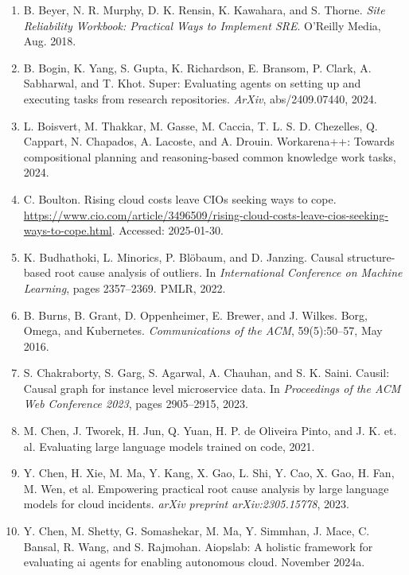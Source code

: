 \documentclass[10pt,UTF8,fontset=fandol]{ctexart}
\begin{document}
\begin{enumerate}[leftmargin=2em,itemsep=2pt]
\item B. Beyer, N. R. Murphy, D. K. Rensin, K. Kawahara, and S. Thorne. \textit{Site Reliability Workbook: Practical Ways to Implement SRE}. O'Reilly Media, Aug. 2018.

\item B. Bogin, K. Yang, S. Gupta, K. Richardson, E. Bransom, P. Clark, A. Sabharwal, and T. Khot. Super: Evaluating agents on setting up and executing tasks from research repositories. \textit{ArXiv}, abs/2409.07440, 2024.

\item L. Boisvert, M. Thakkar, M. Gasse, M. Caccia, T. L. S. D. Chezelles, Q. Cappart, N. Chapados, A. Lacoste, and A. Drouin. Workarena++: Towards compositional planning and reasoning-based common knowledge work tasks, 2024.

\item C. Boulton. Rising cloud costs leave CIOs seeking ways to cope. \url{https://www.cio.com/article/3496509/rising-cloud-costs-leave-cios-seeking-ways-to-cope.html}. Accessed: 2025-01-30.

\item K. Budhathoki, L. Minorics, P. Bl\"obaum, and D. Janzing. Causal structure-based root cause analysis of outliers. In \textit{International Conference on Machine Learning}, pages 2357--2369. PMLR, 2022.

\item B. Burns, B. Grant, D. Oppenheimer, E. Brewer, and J. Wilkes. Borg, Omega, and Kubernetes. \textit{Communications of the ACM}, 59(5):50--57, May 2016.

\item S. Chakraborty, S. Garg, S. Agarwal, A. Chauhan, and S. K. Saini. Causil: Causal graph for instance level microservice data. In \textit{Proceedings of the ACM Web Conference 2023}, pages 2905--2915, 2023.

\item M. Chen, J. Tworek, H. Jun, Q. Yuan, H. P. de Oliveira Pinto, and J. K. et. al. Evaluating large language models trained on code, 2021.

\item Y. Chen, H. Xie, M. Ma, Y. Kang, X. Gao, L. Shi, Y. Cao, X. Gao, H. Fan, M. Wen, et al. Empowering practical root cause analysis by large language models for cloud incidents. \textit{arXiv preprint arXiv:2305.15778}, 2023.

\item Y. Chen, M. Shetty, G. Somashekar, M. Ma, Y. Simmhan, J. Mace, C. Bansal, R. Wang, and S. Rajmohan. Aiopslab: A holistic framework for evaluating ai agents for enabling autonomous cloud. November 2024a.


\end{enumerate}
\end{document}
